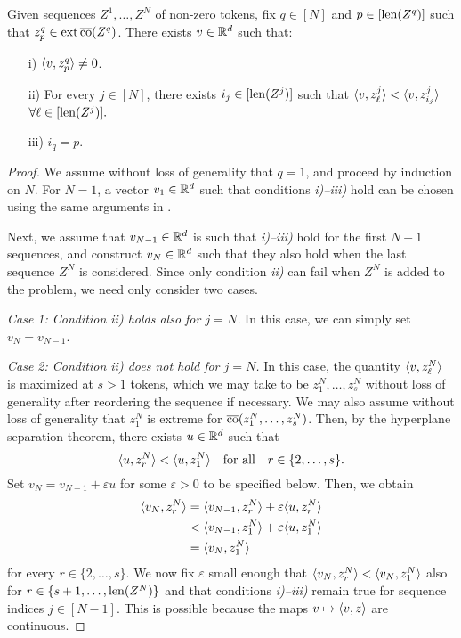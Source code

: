\documentclass[11pt,a4paper]{amsart}
\begin{document}
\begin{lemma}\label{lem:auxLemmaSingleLeader}
Given sequences $Z^1, \dots, Z^N$ of non-zero tokens, fix $q\in [N]$ and $p\in [\operatorname{len} (Z^q)]$ such that $z_p^q \in \operatorname{ext}\operatorname{\overline{co}}(Z^q)$. There exists $v\in \mathbb{R}^d$ such that:
\begin{enumerate}[topsep=0pt,itemsep=0pt]
    \item[i)] $\langle v, z_p^q \rangle \neq 0$.
    \item[ii)] For every $j \in [N]$, there exists $i_j\in [\operatorname{len} (Z^j)]$ such that $\langle v, z_\ell^j \rangle < \langle v, z_{i_j}^j \rangle$ $\forall \ell \in [\operatorname{len} (Z^j)].$
    \item[iii)] $i_q = p$.
\end{enumerate}
\end{lemma}
\begin{proof}
We assume without loss of generality that $q = 1$, and proceed by induction on $N$. For $N=1$, a vector $v_1\in \mathbb{R}^d$ such that conditions \textit{i)--iii)} hold can be chosen using the same arguments in . 

Next, we assume that $v_{N-1}\in \mathbb{R}^d$ is such that \textit{i)--iii)} hold for the first $N-1$ sequences, and construct $v_{N}\in \mathbb{R}^d$ such that they also hold when the last sequence $Z^N$ is considered. Since only condition \textit{ii)} can fail when $Z^N$ is added to the problem, we need only consider two cases.

\textit{Case 1: Condition \textit{ii)} holds also for $j=N$.} In this case, we can simply set $v_{N} = v_{N-1}$.

\textit{Case 2: Condition \textit{ii)} does not hold for $j=N$.} In this case, the quantity $\langle v, z_\ell^{N} \rangle$ is maximized at $s>1$ tokens, which we may take to be $z_1^{N}, \dots, z_s^{N}$ without loss of generality after reordering the sequence if necessary. We may also assume without loss of generality that $z_1^{N}$ is extreme for $\operatorname{\overline{co}}(z_1^{N}, \dots, z_s^{N})$. Then, by the hyperplane separation theorem, there exists $u\in\mathbb{R}^d$ such that 
\begin{equation}
    \langle u, z_r^{N} \rangle < \langle u, z_1^{N} \rangle \quad \text{for all} \quad r \in \{2,\dots,s\}.
\end{equation}
Set $v_{N} = v_{N-1} + \varepsilon u$ for some $\varepsilon>0$ to be specified below. Then, we obtain
\begin{equation}
\begin{aligned}
    \langle v_{N}, z_r^{N} \rangle &= \langle v_{N-1}, z_r^{N} \rangle + \varepsilon \langle u, z_r^{N} \rangle  \\
    &< \langle v_{N-1}, z_1^{N} \rangle + \varepsilon \langle u, z_1^{N} \rangle  \\
    &= \langle v_{N}, z_1^{N} \rangle
\end{aligned}
\end{equation}
for every $r \in \{2,\dots, s\}$. We now fix $\varepsilon$ small enough that $\langle v_{N}, z_r^{N} \rangle < \langle v_{N}, z_1^{N} \rangle$ also for $r\in\{s+1,\ldots,\operatorname{len}(Z^N)\}$ and that conditions \textit{i)--iii)} remain true for sequence indices $j\in[N-1]$. This is possible because the maps $v\mapsto \langle v, z \rangle$ are continuous. \qedhere
\end{proof}
\end{document}
